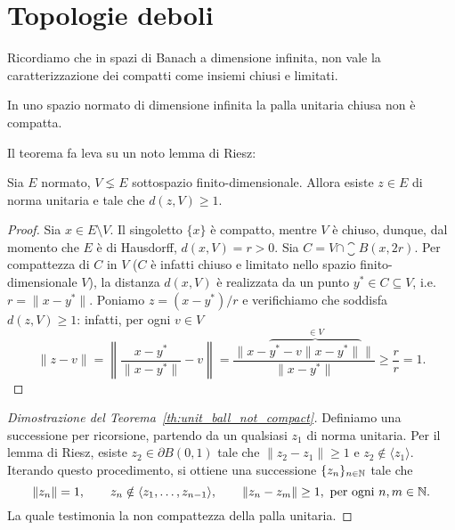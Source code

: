 \chapter{Topologie deboli}
Ricordiamo che in spazi di Banach a dimensione infinita, non vale la caratterizzazione dei compatti come insiemi chiusi e limitati.

\begin{theorem}
\label{th:unit_ball_not_compact}
	In uno spazio normato di dimensione infinita la palla unitaria chiusa non è compatta.
\end{theorem}

Il teorema fa leva su un noto lemma di Riesz:

\begin{lemma}[Riesz]
\label{lemma:riesz}
	Sia $E$ normato, $V \lneq E$ sottospazio finito-dimensionale.
	Allora esiste $z \in E$ di norma unitaria e tale che $d(z, V) \geq 1$.
\end{lemma}
\begin{proof}
	Sia $x \in E \setminus V$. Il singoletto $\{x\}$ è compatto, mentre $V$ è chiuso, dunque, dal momento che $E$ è di Hausdorff, $d(x,V) = r > 0$.
	Sia $C = V \cap \closure B(x, 2r)$. Per compattezza di $C$ in $V$ ($C$ è infatti chiuso e limitato nello spazio finito-dimensionale $V$), la distanza $d(x,V)$ è realizzata da un punto $y^* \in C \subseteq V$, i.e.\ $r = \|x-y^*\|$. Poniamo $z = (x-y^*)/r$ e verifichiamo che soddisfa $d(z, V) \geq 1$: infatti, per ogni $v \in V$
	\begin{equation*}
		\|z-v\| = \left\| \frac{x-y^*}{\|x-y^*\|} - v \right\| = \frac{\|x-\overbrace{y^* - v\|x-y^*\|}^{\in V}\|}{\|x-y^*\|} \geq \frac{r}r =1.
	\end{equation*}
\end{proof}

\begin{proof}[Dimostrazione del Teorema~\ref{th:unit_ball_not_compact}]
	Definiamo una successione per ricorsione, partendo da un qualsiasi $z_1$ di norma unitaria. Per il lemma di Riesz, esiste $z_2 \in \partial B(0,1)$ tale che $\|z_2 - z_1\| \geq 1$ e $z_2 \notin \langle z_1 \rangle$.
	Iterando questo procedimento, si ottiene una successione $\{z_n\}_{n \in \mathbb{N}}$ tale che
	\begin{equation*}
		\|z_n\| = 1, \qquad z_n \notin \langle z_1, \ldots, z_{n-1}\rangle, \qquad \|z_n - z_m\| \geq 1,\ \text{per ogni $n, m \in \mathbb{N}$}.
	\end{equation*}
	La quale testimonia la non compattezza della palla unitaria.
\end{proof}

